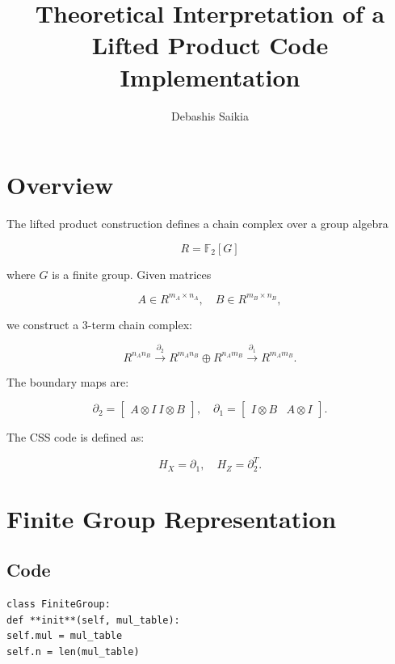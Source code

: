 \documentclass[11pt]{article}
\title{Theoretical Interpretation of a Lifted Product Code Implementation}
\author{Debashis Saikia}
\date{}
\begin{document}
\maketitle

\section{Overview}

The lifted product construction defines a chain complex over a group algebra

\begin{equation}
R = \mathbb{F}_2[G]
\end{equation}

where $G$ is a finite group. Given matrices

\begin{equation}
A \in R^{m_A \times n_A}, \quad B \in R^{m_B \times n_B},
\end{equation}

we construct a 3-term chain complex:

\begin{equation}
R^{n_A n_B}
\overset{\partial_2}{\longrightarrow}
R^{m_A n_B} \oplus R^{n_A m_B}
\overset{\partial_1}{\longrightarrow}
R^{m_A m_B}.
\end{equation}

The boundary maps are:

\begin{equation}
\partial_2 =
\begin{bmatrix}
A \otimes I \
I \otimes B
\end{bmatrix},
\quad
\partial_1 =
\begin{bmatrix}
I \otimes B & A \otimes I
\end{bmatrix}.
\end{equation}

The CSS code is defined as:

\begin{equation}
H_X = \partial_1, \quad H_Z = \partial_2^{T}.
\end{equation}

\section{Finite Group Representation}

\subsection{Code}
\begin{verbatim}
class FiniteGroup:
def **init**(self, mul_table):
self.mul = mul_table
self.n = len(mul_table)
\end{verbatim}
\end{document}
